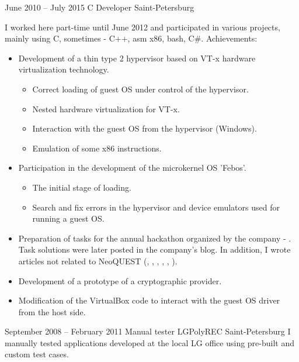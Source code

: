 \documentclass[11pt,a4paper,sans]{moderncv}
\begin{document}
\cventry
{June 2010 -- July 2015}
{C Developer}
{}
{Saint-Petersburg}
{}
{I worked here part-time until June 2012 and participated in various projects, mainly using C, sometimes - C++, asm x86, bash, C\#.\newline{}
Achievements:
\begin{itemize}
\item Development of a thin type 2 hypervisor based on VT-x hardware virtualization technology.
  \begin{itemize}
  \item Correct loading of guest OS under control of the hypervisor.
  \item Nested hardware virtualization for VT-x.
  \item Interaction with the guest OS from the hypervisor (Windows).
  \item Emulation of some x86 instructions.
  \end{itemize}
\item Participation in the development of the microkernel OS ’Febos’.
  \begin{itemize}
  \item The initial stage of loading.
  \item Search and fix errors in the hypervisor and device emulators used for running a guest OS.
  \end{itemize}
\item Preparation of tasks for the annual hackathon organized by the company - . Task solutions were later posted in the company’s blog. In addition, I wrote articles not related to NeoQUEST (,
								,
								,
								,
								,
								).
\item Development of a prototype of a  cryptographic provider.
\item Modification of the VirtualBox code to interact with the guest OS driver from the host side.
\end{itemize}}

\cventry
{September 2008 -- February 2011}
{Manual tester}
{LGPolyREC}
{Saint-Petersburg}
{}
{I manually tested applications developed at the local LG office using pre-built and custom test cases.}
\end{document}
